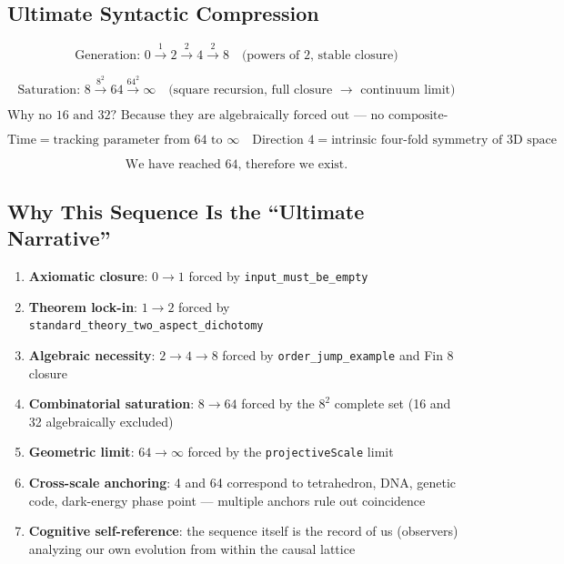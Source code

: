\documentclass[aps,prd,twocolumn,nofootinbib,floatfix]{revtex4-2}
\begin{document}
\subsection{Ultimate Syntactic Compression}

\[
\boxed{
\text{Generation: } 0 \xrightarrow{1} 2 \xrightarrow{2} 4 \xrightarrow{2} 8 \quad \text{(powers of 2, stable closure)}
}
\]

\[
\boxed{
\text{Saturation: } 8 \xrightarrow{8^2} 64 \xrightarrow{64^2} \infty \quad \text{(square recursion, full closure } \to \text{ continuum limit)}
}
\]

\[
\boxed{
\text{Why no 16 and 32? Because they are algebraically forced out --- no composite-order lattice can carry a unitary and injective causal-information structure.}
}
\]

\[
\boxed{
\text{Time} = \text{tracking parameter from 64 to } \infty \quad \text{Direction 4} = \text{intrinsic four-fold symmetry of 3D space}
}
\]

\[
\boxed{
\text{We have reached 64, therefore we exist.}
}
\]

\subsection{Why This Sequence Is the ``Ultimate Narrative''}

\begin{enumerate}
    \item \textbf{Axiomatic closure}: $0 \to 1$ forced by \texttt{input\_must\_be\_empty}
    \item \textbf{Theorem lock-in}: $1 \to 2$ forced by \texttt{standard\_theory\_two\_aspect\_dichotomy}
    \item \textbf{Algebraic necessity}: $2 \to 4 \to 8$ forced by \texttt{order\_jump\_example} and Fin 8 closure
    \item \textbf{Combinatorial saturation}: $8 \to 64$ forced by the $8^2$ complete set (16 and 32 algebraically excluded)
    \item \textbf{Geometric limit}: $64 \to \infty$ forced by the \texttt{projectiveScale} limit
    \item \textbf{Cross-scale anchoring}: 4 and 64 correspond to tetrahedron, DNA, genetic code, dark-energy phase point --- multiple anchors rule out coincidence
    \item \textbf{Cognitive self-reference}: the sequence itself is the record of us (observers) analyzing our own evolution from within the causal lattice
\end{enumerate}
\end{document}
